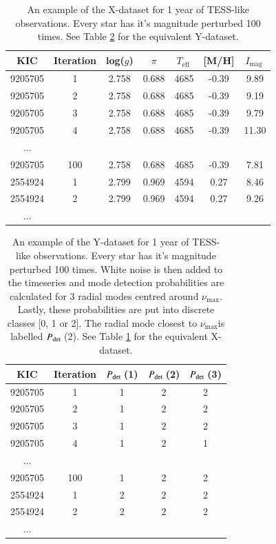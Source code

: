 \documentclass[a4paper,fleqn,usenatbib,useAMS]{mnras}
\newcommand{\numax}{\ensuremath{\nu_{\textrm{max}}}}
\newcommand{\teff}{\ensuremath{T_{\textrm{eff}}\:}}
\newcommand{\pdet}{\ensuremath{P_{\rm det}\:}}
\newcommand{\imag}{\ensuremath{I_{\textrm{mag}}\:}}
\begin{document}
\begin{table}
\begin{center}
\begin{tabular}{|*{7}{c|}}
KIC     & Iteration & log($g$) & $\pi$ & \teff & [M/H] & \imag \\
\hline
9205705	& 1         & 2.758	& 0.688 & 4685 & -0.39 & 9.89  \\
9205705	& 2         & 2.758	& 0.688 & 4685 & -0.39 & 9.19  \\
9205705	& 3         & 2.758	& 0.688 & 4685 & -0.39 & 9.79  \\
9205705	& 4         & 2.758	& 0.688 & 4685 & -0.39 & 11.30 \\
...                                                        \\
9205705	& 100       & 2.758	& 0.688 & 4685 & -0.39 & 7.81  \\
2554924	& 1	        & 2.799	& 0.969 & 4594 &  0.27 & 8.46  \\
2554924	& 2         & 2.799	& 0.969 & 4594 &  0.27 & 9.26  \\
...                                                         \\
\hline
\end{tabular}
\end{center}
\caption{An example of the X-dataset for 1 year of TESS-like observations. Every star has it's magnitude perturbed 100 times. See Table \ref{tab: y dataset} for the equivalent Y-dataset.}
\label{tab: x dataset}
\end{table}

\begin{table}
\begin{center}
\begin{tabular}{|*{5}{c|}}
KIC & Iteration & \pdet(1) & \pdet(2) & \pdet(3) \\
\hline
9205705	& 1     & 1 & 2 & 2 \\
9205705	& 2     & 1 & 2 & 2 \\
9205705	& 3     & 1 & 2 & 2 \\
9205705	& 4     & 1 & 2 & 1 \\
...                         \\
9205705	& 100   & 1 & 2 & 2 \\
2554924	& 1	    & 2 & 2 & 2 \\
2554924	& 2     & 2 & 2 & 2 \\
...                         \\
\hline
\end{tabular}
\end{center}
\caption{An example of the Y-dataset for 1 year of TESS-like observations. Every star has it's magnitude perturbed 100 times. White noise is then added to the timeseries and mode detection probabilities are calculated for 3 radial modes centred around \numax. Lastly, these probabilities are put into discrete classes [0, 1 or 2]. The radial mode closest to \numax is labelled \pdet(2). See Table \ref{tab: x dataset} for the equivalent X-dataset.}
\label{tab: y dataset}
\end{table}
\end{document}
